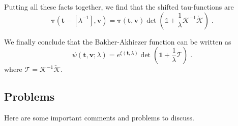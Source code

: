\documentclass[a4paper,11pt]{amsart}
\begin{document}
Putting all these facts together, we find that the shifted
tau-functions are
\begin{equation}
  \bm{\tau}(\bm{t} - [\lambda^{-1}], \bm{v}) =
  \bm{\tau}(\bm{t}, \bm{v})
  \det \left( \mathbb{1} + \frac{1}{\lambda}
  \mathcal{K}^{-1} \check{\mathcal{K}} \right)\; .
\end{equation}

We finally conclude that the Bakher-Akhiezer function can be written as
\begin{equation}
  \psi(\bm{t},\bm{v}; \lambda) = e^{\xi(\bm{t}, \lambda)}
  \det \left( \mathbb{1} +
    \frac{1}{\lambda} \mathcal{T}
  \right)\; .
\end{equation}
where \(\mathcal{T} = \mathcal{K}^{-1} \check{\mathcal{K}}\). 









\subsection{Problems}
Here are some important comments and problems to discuss. 
\end{document}
